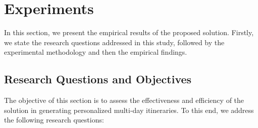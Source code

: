 \section{Experiments}
\label{sec:experiments}

In this section, we present the empirical results of the proposed \trip solution. Firstly, we state the research questions addressed in this study, followed by the experimental methodology and then the empirical findings.

\subsection{Research Questions and Objectives}

The objective of this section is to assess the effectiveness and efficiency of the \trip solution in generating personalized multi-day itineraries. To this end,  we address the following research questions:

